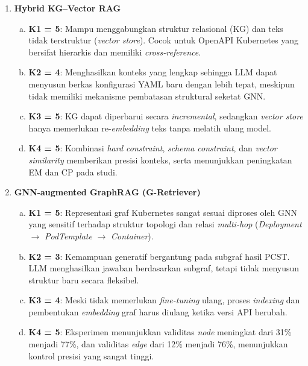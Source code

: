 \begin{enumerate}
    \item \textbf{Hybrid KG--Vector RAG}
    \begin{enumerate}[a.]
        \item \textbf{K1 = 5}:
        Mampu menggabungkan struktur relasional (KG) dan teks tidak terstruktur (\textit{vector store}). Cocok untuk OpenAPI Kubernetes yang bersifat hierarkis dan memiliki \textit{cross-reference}.

        \item \textbf{K2 = 4}:
        Menghasilkan konteks yang lengkap sehingga LLM dapat menyusun berkas konfigurasi YAML baru dengan lebih tepat, meskipun tidak memiliki mekanisme pembatasan struktural seketat GNN.

        \item \textbf{K3 = 5}:
        KG dapat diperbarui secara \textit{incremental}, sedangkan \textit{vector store} hanya memerlukan re-\textit{embedding} teks tanpa melatih ulang model.

        \item \textbf{K4 = 5}:
        Kombinasi \textit{hard constraint}, \textit{schema constraint}, dan \textit{vector similarity} memberikan presisi konteks, serta menunjukkan peningkatan EM dan CP pada studi.
    \end{enumerate}

    \item \textbf{GNN-augmented GraphRAG (G-Retriever)}
    \begin{enumerate}[a.]
        \item \textbf{K1 = 5}:
        Representasi graf Kubernetes sangat sesuai diproses oleh GNN yang sensitif terhadap struktur topologi dan relasi \textit{multi-hop} (\textit{Deployment} $\rightarrow$ \textit{PodTemplate} $\rightarrow$ \textit{Container}).

        \item \textbf{K2 = 3}:
        Kemampuan generatif bergantung pada subgraf hasil PCST. LLM menghasilkan jawaban berdasarkan subgraf, tetapi tidak menyusun struktur baru secara fleksibel.

        \item \textbf{K3 = 4}:
        Meski tidak memerlukan \textit{fine-tuning} ulang, proses \textit{indexing} dan pembentukan \textit{embedding} graf harus diulang ketika versi API berubah.

        \item \textbf{K4 = 5}:
        Eksperimen menunjukkan validitas \textit{node} meningkat dari 31\% menjadi 77\%, dan validitas \textit{edge} dari 12\% menjadi 76\%, menunjukkan kontrol presisi yang sangat tinggi.
    \end{enumerate}


\end{enumerate}
